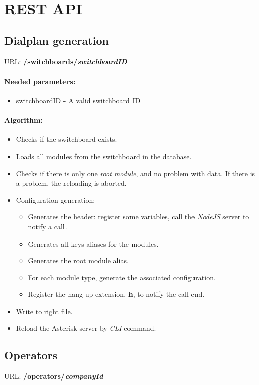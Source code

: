 \section{REST API}
	
\subsection{Dialplan generation}
URL: \textbf{/switchboards/{\textit{switchboardID}}}
\paragraph{Needed parameters:}
\begin{itemize}
\item {switchboardID} - A valid switchboard ID
\end{itemize}


\paragraph{Algorithm:}
\begin{itemize}
	\item Checks if the switchboard exists.
	\item Loads all modules from the switchboard in the database.
	\item Checks if there is only one \textit{root module}, and no problem with data. If there is a problem, the reloading is aborted.
	\item Configuration generation:
	
		\begin{itemize}
			\item Generates the header: register some variables, call the \textit{NodeJS} server to notify a call.
			\item Generates all keys aliases for the modules. 
			\item Generates the root module alias.
			\item For each module type, generate the associated configuration.
			\item Register the hang up extension, \textbf{h}, to notify the call end.
		\end{itemize}	
	\item Write to right file.
	\item Reload the Asterisk server by \textit{CLI} command.

\end{itemize}

\subsection{Operators}
URL: \textbf{/operators/{\textit{companyId}}}

